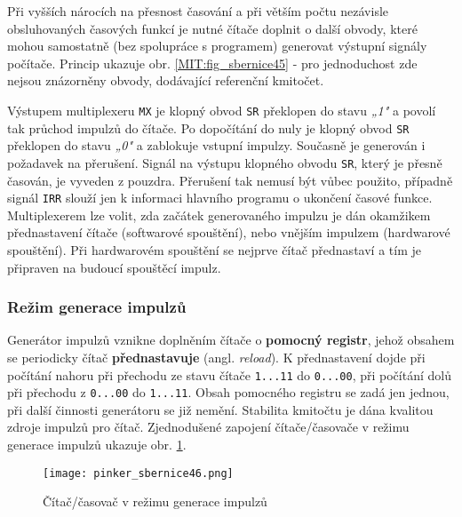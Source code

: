         Při vyšších nárocích na přesnost časování a při větším počtu nezávisle obsluhovaných 
        časových funkcí je nutné čítače doplnit o další obvody, které mohou samostatně (bez 
        spolupráce s programem) generovat výstupní signály počítače. Princip ukazuje obr. 
        \ref{MIT:fig_sbernice45} - pro jednoduchost zde nejsou znázorněny obvody, dodávající 
        referenční kmitočet.
        
        Výstupem multiplexeru \texttt{MX} je klopný obvod \texttt{SR} překlopen do stavu \emph{„1"} 
        a povolí tak průchod impulzů do čítače. Po dopočítání do nuly je klopný obvod \texttt{SR} 
        překlopen do stavu \emph{„0"} a zablokuje vstupní impulzy. Současně je generován i 
        požadavek na přerušení. Signál na výstupu klopného obvodu \texttt{SR}, který je přesně 
        časován, je vyveden z pouzdra. Přerušení tak nemusí být vůbec použito, případně signál 
        \texttt{IRR} slouží jen k informaci hlavního programu o  ukončení časové funkce. 
        Multiplexerem lze volit, zda začátek generovaného impulzu je dán okamžikem přednastavení 
        čítače (softwarové spouštění), nebo vnějším impulzem (hardwarové spouštění). Při 
        hardwarovém spouštění se nejprve čítač přednastaví a tím je připraven na budoucí spouštěcí impulz.
        
      \subsubsection{Režim generace impulzů}
        Generátor impulzů vznikne doplněním čítače o \textbf{pomocný registr}, jehož obsahem se 
        periodicky čítač \textbf{přednastavuje} (angl. \emph{reload}). K přednastavení dojde při 
        počítání nahoru při přechodu ze stavu čítače \texttt{1...11} do \texttt{0...00}, při 
        počítání dolů při přechodu z \texttt{0...00} do \texttt{1...11}. Obsah pomocného registru 
        se zadá jen jednou, při další činnosti generátoru se již nemění. Stabilita kmitočtu je dána 
        kvalitou zdroje impulzů pro čítač. Zjednodušené zapojení čítače/časovače v režimu generace 
        impulzů ukazuje obr. \ref{MIT:fig_sbernice46}.
        
        \begin{figure}[ht!] %
          \centering
          \texttt{[image: pinker\_sbernice46.png]}
          \caption{Čítač/časovač v režimu generace impulzů}
          \label{MIT:fig_sbernice46}
        \end{figure}
        
